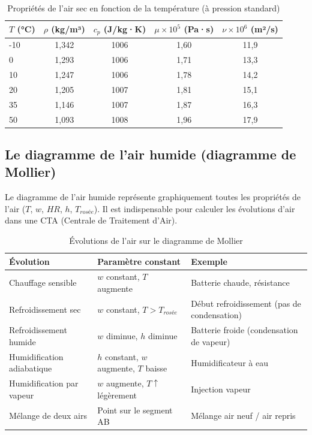 \begin{table}[H]
  \centering
  \caption{Propriétés de l'air sec en fonction de la température (à pression standard)}
  \begin{tabular}{lcccc}
    \toprule
    $T$ (°C) & $\rho$ (kg/m³) & $c_p$ (J/kg·K) & $\mu \times 10^5$ (Pa·s) & $\nu \times 10^6$ (m²/s) \\
    \midrule
    -10 & 1,342 & 1006 & 1,60 & 11,9 \\
    0 & 1,293 & 1006 & 1,71 & 13,3 \\
    10 & 1,247 & 1006 & 1,78 & 14,2 \\
    20 & 1,205 & 1007 & 1,81 & 15,1 \\
    35 & 1,146 & 1007 & 1,87 & 16,3 \\
    50 & 1,093 & 1008 & 1,96 & 17,9 \\
    \bottomrule
  \end{tabular}
\end{table}

\subsection{Le diagramme de l'air humide (diagramme de Mollier)}

Le diagramme de l'air humide représente graphiquement toutes les propriétés de l'air ($T$, $w$, $HR$, $h$, $T_{rosée}$). Il est indispensable pour calculer les évolutions d'air dans une CTA (Centrale de Traitement d'Air).

\begin{table}[H]
  \centering
  \caption{Évolutions de l'air sur le diagramme de Mollier}
  \begin{tabular}{p{3.5cm}p{4cm}p{4cm}}
    \toprule
    Évolution & Paramètre constant & Exemple \\
    \midrule
    Chauffage sensible & $w$ constant, $T$ augmente & Batterie chaude, résistance \\
    Refroidissement sec & $w$ constant, $T > T_{rosée}$ & Début refroidissement (pas de condensation) \\
    Refroidissement humide & $w$ diminue, $h$ diminue & Batterie froide (condensation de vapeur) \\
    Humidification adiabatique & $h$ constant, $w$ augmente, $T$ baisse & Humidificateur à eau \\
    Humidification par vapeur & $w$ augmente, $T \uparrow$ légèrement & Injection vapeur \\
    Mélange de deux airs & Point sur le segment AB & Mélange air neuf / air repris \\
    \bottomrule
  \end{tabular}
\end{table}

